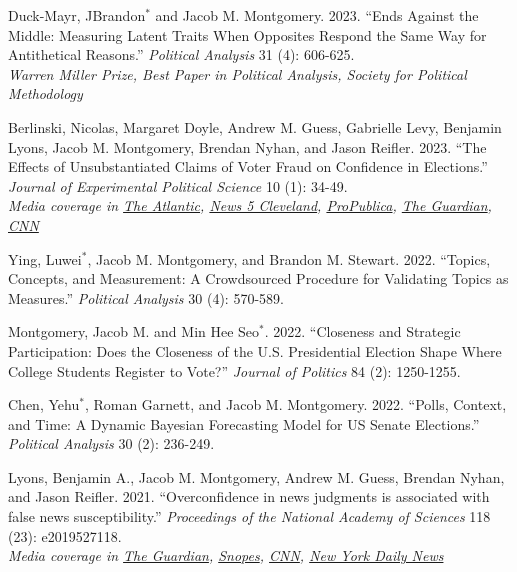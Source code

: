 \documentclass[10pt]{article}
\renewenvironment{CV}
  {\begin{list}{}
    {\renewcommand{\makelabel}{\entrylabel}
    \setlength{\labelwidth}{55pt}
    \setlength{\leftmargin}{62pt}
  }}
  {\end{list}}
\newcommand{\cvnote}[1]{\\[0.1em]{\hspace*{0.5em}\small\itshape #1}}
\newcommand{\student}[1]{#1$^{*}$}
\begin{document}
\begin{CV}
 \item[]  \student{Duck-Mayr, JBrandon} and Jacob
   M. Montgomery.  2023. ``Ends Against the Middle: Measuring Latent
Traits When Opposites Respond the Same Way
for Antithetical Reasons.'' 
   \emph{Political Analysis} 31 (4): 606-625.
\cvnote{Warren Miller Prize, Best Paper in \emph{Political Analysis}, 
Society for Political Methodology}

\item[]  Berlinski, Nicolas,  Margaret Doyle, Andrew
  M. Guess, Gabrielle Levy, Benjamin Lyons, Jacob M. Montgomery, Brendan
  Nyhan, and Jason Reifler. 2023. ``The Effects of
  Unsubstantiated Claims of Voter Fraud on Confidence in Elections.''
  \textit{Journal of Experimental Political Science} 10 (1): 34-49.\cvnote{Media coverage in \href{https://www.theatlantic.com/ideas/archive/2020/06/election-confidence-fraud/612358/}{The Atlantic},  \href{https://www.news5cleveland.com/news/national/despite-his-claims-expert-says-president-donald-trump-would-likely-benefit-from-mail-in-voting}{News 5 Cleveland}, \href{https://www.propublica.org/article/outright-lies-voting-misinformation-flourishes-on-facebook}{ProPublica}, \href{https://www.theguardian.com/us-news/2021/jul/01/researchers-reveal-corrosive-power-of-trump-lie-of-a-stolen-election}{The Guardian}, \href{https://www.cnn.com/2021/10/07/opinions/facebook-misinformation-and-how-to-fix-it-himelfarb-howard/index.html}{CNN}}
  
 
\item[] \student{Ying, Luwei}, Jacob M. Montgomery, and
   Brandon M. Stewart. 2022. ``Topics, Concepts, and Measurement:
A Crowdsourced Procedure for Validating Topics as Measures.''
\emph{Political Analysis} 30 (4): 570-589.

 \item[] Montgomery, Jacob M. and \student{Min Hee Seo}. 2022. ``Closeness and Strategic Participation: Does the
   Closeness of the U.S. Presidential Election Shape Where College
   Students Register to Vote?'' \textit{Journal of Politics} 84 (2): 1250-1255.
 

\item[] \student{Chen, Yehu}, Roman Garnett, and Jacob
  M. Montgomery. 2022. ``Polls, Context, and Time: A Dynamic Bayesian
  Forecasting Model for US Senate Elections.'' \emph{Political
    Analysis} 30 (2): 236-249.
   
\item[]  Lyons, Benjamin A., Jacob M. Montgomery,
  Andrew M. Guess, Brendan Nyhan, and Jason
  Reifler. 2021. ``Overconfidence in news judgments is
  associated with false news susceptibility.''  \textit{Proceedings of
    the National Academy of Sciences} 118 (23): e2019527118.\cvnote{Media coverage in \href{https://www.theguardian.com/media/2021/may/31/confident-spotting-fake-news-if-so-more-likely-fall-victim}{The Guardian}, \href{https://www.snopes.com/news/2021/05/31/misinformation-duped-study/}{Snopes}, \href{https://www.cnn.com/2021/05/31/health/fake-news-study/index.html}{CNN}, \href{https://www.nydailynews.com/news/crime/ny-americans-fake-news-20210601-ulimjxy5czamrjv3erevx7e75q-story.html}{New York Daily News}}
  

\end{CV}
\end{document}
